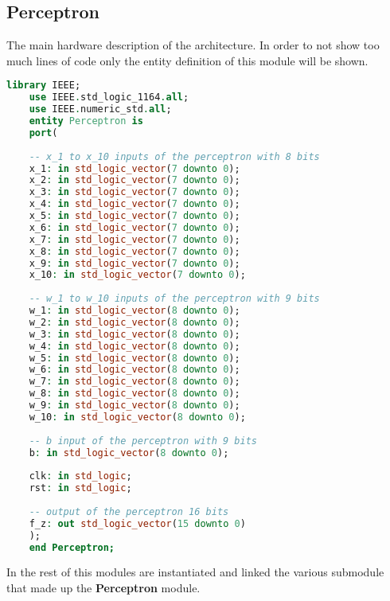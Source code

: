 \subsection{Perceptron}
The main hardware description of the architecture. In order to not show too much lines of code only the entity definition of this module will be shown.
\begin{lstlisting}[language=VHDL]
	library IEEE;
	use IEEE.std_logic_1164.all;
	use IEEE.numeric_std.all;
	entity Perceptron is
	port(
	
	-- x_1 to x_10 inputs of the perceptron with 8 bits
	x_1: in std_logic_vector(7 downto 0);
	x_2: in std_logic_vector(7 downto 0);
	x_3: in std_logic_vector(7 downto 0);
	x_4: in std_logic_vector(7 downto 0);
	x_5: in std_logic_vector(7 downto 0);
	x_6: in std_logic_vector(7 downto 0);
	x_7: in std_logic_vector(7 downto 0);
	x_8: in std_logic_vector(7 downto 0);
	x_9: in std_logic_vector(7 downto 0);
	x_10: in std_logic_vector(7 downto 0);
	
	-- w_1 to w_10 inputs of the perceptron with 9 bits
	w_1: in std_logic_vector(8 downto 0);
	w_2: in std_logic_vector(8 downto 0);
	w_3: in std_logic_vector(8 downto 0);
	w_4: in std_logic_vector(8 downto 0);
	w_5: in std_logic_vector(8 downto 0);
	w_6: in std_logic_vector(8 downto 0);
	w_7: in std_logic_vector(8 downto 0);
	w_8: in std_logic_vector(8 downto 0);
	w_9: in std_logic_vector(8 downto 0);
	w_10: in std_logic_vector(8 downto 0);
	
	-- b input of the perceptron with 9 bits
	b: in std_logic_vector(8 downto 0);
	
	clk: in std_logic;
	rst: in std_logic;
	
	-- output of the perceptron 16 bits
	f_z: out std_logic_vector(15 downto 0)
	);
	end Perceptron;
\end{lstlisting}

In the rest of this modules are instantiated and linked the various submodule that made up the \textbf{Perceptron} module.

